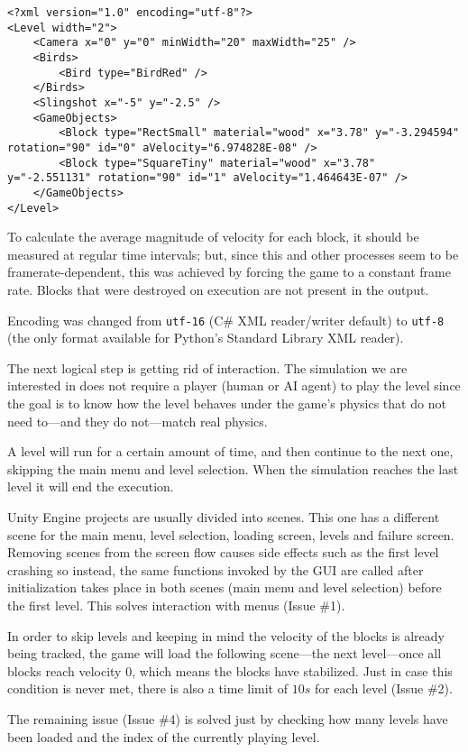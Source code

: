  \bigskip
 
\lstset{language=XML}
\begin{lstlisting}[caption=Sample level output to show format, label=xmlsampleOUT]
<?xml version="1.0" encoding="utf-8"?>
<Level width="2">
	<Camera x="0" y="0" minWidth="20" maxWidth="25" />
	<Birds>
		<Bird type="BirdRed" />
	</Birds>
	<Slingshot x="-5" y="-2.5" />
	<GameObjects>
		<Block type="RectSmall" material="wood" x="3.78" y="-3.294594" rotation="90" id="0" aVelocity="6.974828E-08" />
		<Block type="SquareTiny" material="wood" x="3.78" y="-2.551131" rotation="90" id="1" aVelocity="1.464643E-07" />
	</GameObjects>
</Level>
\end{lstlisting}

To calculate the average magnitude of velocity for each block, it should be measured at regular time intervals; but, since this and other processes seem to be framerate-dependent, this was achieved by forcing the game to a constant frame rate. Blocks that were destroyed on execution are not present in the output.

Encoding was changed from \texttt{utf-16} (C\# XML reader/writer default) to \texttt{utf-8} (the only format available for Python's Standard Library XML reader).

The next logical step is getting rid of interaction. The simulation we are interested in does not require a player (human or AI agent) to play the level since the goal is to know how the level behaves under the game's physics that do not need to---and they do not---match real physics.

A level will run for a certain amount of time, and then continue to the next one, skipping the main menu and level selection. When the simulation reaches the last level it will end the execution.

Unity Engine projects are usually divided into scenes. This one has a different scene for the main menu, level selection, loading screen, levels and failure screen. Removing scenes from the screen flow causes side effects such as the first level crashing so instead, the same functions invoked by the GUI are called after initialization takes place in both scenes (main menu and level selection) before the first level. This solves interaction with menus (Issue \#1). 

In order to skip levels and keeping in mind the velocity of the blocks is already being tracked, the game will load the following scene---the next level---once all blocks reach velocity $0$, which means the blocks have stabilized. Just in case this condition is never met, there is also a time limit of $10s$ for each level (Issue \#2). 

The remaining issue (Issue \#4) is solved just by checking how many levels have been loaded and the index of the currently playing level.


